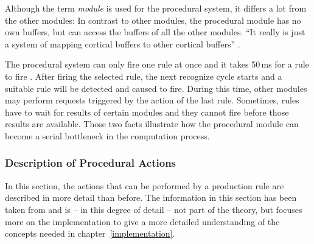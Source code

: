 Although the term \emph{module} is used for the procedural system, it differs a lot from the other modules: In contrast to other modules, the procedural module has no own buffers, but can access the buffers of all the other modules. ``It really is just a system of mapping cortical buffers to other cortical buffers'' \cite[p. 54]{anderson_how_2007}.

The procedural system can only fire one rule at once and it takes 50\,ms for a rule to fire \cite[p. 54]{anderson_how_2007}. After firing the selected rule, the next recognize cycle starts and a suitable rule will be detected and caused to fire. During this time, other modules may perform requests triggered by the action of the last rule. Sometimes, rules have to wait for results of certain modules and they cannot fire before those results are available. Those two facts illustrate how the procedural module can become a serial bottleneck in the computation process.

\subsubsection{Description of Procedural Actions}
\label{description_of_proc_actions}

In this section, the actions that can be performed by a production rule are described in more detail than before. The information in this section has been taken from  and is -- in this degree of detail -- not part of the theory, but focuses more on the implementation to give a more detailed understanding of the concepts needed in chapter~\ref{implementation}.


